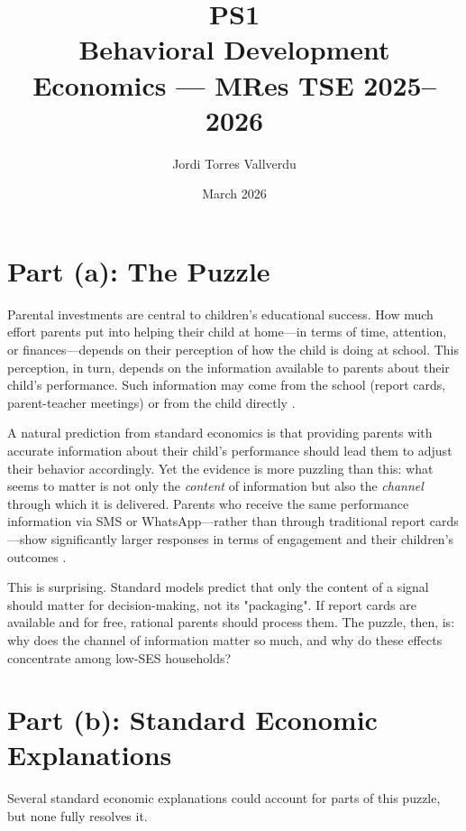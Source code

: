 \documentclass[11pt]{article}
\title{PS1\\[4pt]
\large Behavioral Development Economics --- MRes TSE 2025--2026}
\author{Jordi Torres Vallverdu}
\date{March 2026}
\begin{document}
\maketitle
\newpage


\section{Part (a): The Puzzle}

Parental investments are central to children's educational success. How much effort parents put into helping their child at home---in terms of time, attention, or finances---depends on their perception of how the child is doing at school. This perception, in turn, depends on the information available to parents about their child's performance. Such information may come from the school (report cards, parent-teacher meetings) or from the child directly \citet{dizonross2019parents}.

A natural prediction from standard economics is that providing parents with accurate information about their child's performance should lead them to adjust their behavior accordingly. Yet the evidence is more puzzling than this: what seems to matter is not only the \emph{content} of information but also the \emph{channel} through which it is delivered. Parents who receive the same performance information via SMS or WhatsApp---rather than through traditional report cards---show significantly larger responses in terms of engagement and their children's outcomes \citet{bergman2021information}. 

This is surprising. Standard models predict that only the content of a signal should matter for decision-making, not its "packaging". If report cards are available and for free, rational parents should process them. The puzzle, then, is: why does the channel of information matter so much, and why do these effects concentrate among low-SES households?

\section{Part (b): Standard Economic Explanations}

Several standard economic explanations could account for parts of this puzzle, but none fully resolves it.
\end{document}
